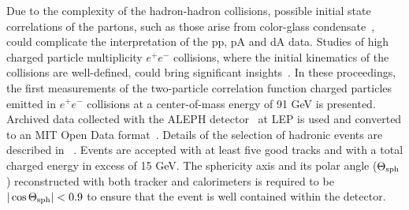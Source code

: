 \documentclass[aps,prl,twocolumn,showpacs,superscriptaddress,groupedaddress]{revtex4}  %
\begin{document}
Due to the complexity of the hadron-hadron collisions, possible initial state correlations of the partons, such as those arise from color-glass condensate~\cite{Gelis:2010nm, Dusling:2013qoz}, could complicate the interpretation of the pp, pA and dA data. Studies of high charged particle multiplicity $e^+e^-$ collisions, where the initial kinematics of the collisions are well-defined, could bring significant insights~\cite{Nagle:2017sjv}. 
In these proceedings, the first measurements of the two-particle correlation function charged particles emitted in $e^+e^-$ collisions at a center-of-mass energy of 91 GeV is presented. Archived data collected with the ALEPH detector~\cite{Decamp:1990jra} at LEP is used and converted to an MIT Open Data format~\cite{Tripathee:2017ybi}. Details of the selection of hadronic events are described in ~\cite{Barate:1996fi}. Events are accepted with at least five good tracks and with a total charged energy in excess of 15 GeV. The sphericity axis and its polar angle ($\Theta_{\rm sph}$) reconstructed with both tracker and calorimeters is required to be $|\cos\Theta_{\rm sph}|<0.9$ to ensure that the event is well contained within the detector.




\end{document}
